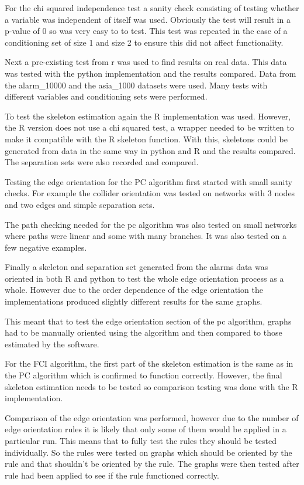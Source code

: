 \documentclass{UoYCSproject}
\begin{document}
For the chi squared independence test a sanity check consisting of testing whether a variable was independent of itself was used. Obviously the test will result in a p-value of 0 so was very easy to to test. This test was repeated in the case of a conditioning set of size 1 and size 2 to ensure this did not affect functionality.

Next a pre-existing test from r was used to find results on real data. This data was tested with the python implementation and the results compared. Data from the alarm\_10000 and the asia\_1000 datasets were used. Many tests with different variables and conditioning sets were performed.

To test the skeleton estimation again the R implementation was used. However, the R version does not use a chi squared test, a wrapper needed to be written to make it compatible with the R skeleton function. With this, skeletons could be generated from data in the same way in python and R and the results compared. The separation sets were also recorded and compared.

Testing the edge orientation for the PC algorithm first started with small sanity checks. For example the collider orientation was tested on networks with 3 nodes and two edges and simple separation sets.

The path checking needed for the pc algorithm was also  tested on small networks where paths were linear and some with many branches. It was also tested on a few negative examples.

Finally a skeleton and separation set generated from the alarms data was oriented in both R and python to test the whole edge orientation process as a whole. However due to the order dependence of the edge orientation the implementations produced slightly different results for the same graphs.

This meant that to test the edge orientation section of the pc algorithm, graphs had to be manually oriented using the algorithm and then compared to those estimated by the software.

For the FCI algorithm, the first part of the skeleton estimation is the same as in the PC algorithm  which is confirmed to function correctly. However, the final skeleton estimation needs to be tested so comparison testing was done with the R implementation.

Comparison of the edge orientation was performed, however due to the number of edge orientation rules it is likely that only some of them would be applied in a particular run. This means that to fully test  the rules they should be tested individually. So the rules were tested on graphs which should be oriented by the rule and that shouldn't be oriented by the rule. The graphs were then tested after rule had been applied to see if the rule functioned correctly.
\end{document}
